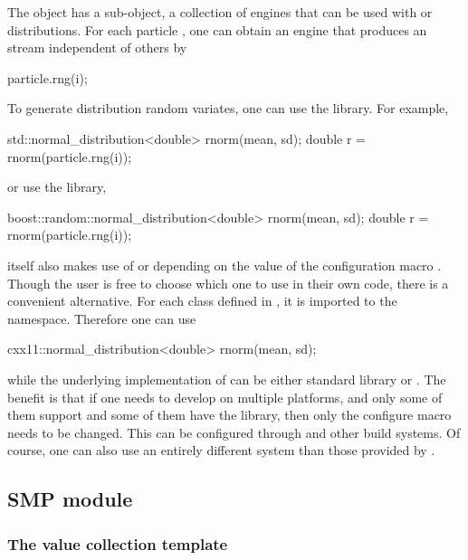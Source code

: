 The  object has a sub-object, a collection of \rng
engines that can be used with \cppoo{}  or \boost
distributions. For each particle , one can obtain an engine that
produces an \rng stream independent of others by
\begin{cppcode}
particle.rng(i);
\end{cppcode}
To generate distribution random variates, one can use the
\cppoo{}  library. For example,
\begin{cppcode}
std::normal_distribution<double> rnorm(mean, sd);
double r = rnorm(particle.rng(i));
\end{cppcode}
or use the \boost library,
\begin{cppcode}
boost::random::normal_distribution<double> rnorm(mean, sd);
double r = rnorm(particle.rng(i));
\end{cppcode}
\vsmc itself also makes use of \cppoo{}  or \boost
depending on the value of the configuration macro
. Though the user is free to choose which
one to use in their own code, there is a convenient alternative. For each
class defined in \cppoo{} , it is imported to the
 namespace. Therefore one can use
\begin{cppcode}
cxx11::normal_distribution<double> rnorm(mean, sd);
\end{cppcode}
while the underlying implementation of  can be
either \cppoo standard library or \boost. The benefit is that if one needs to
develop on multiple platforms, and only some of them support \cppoo and some
of them have the \boost library, then only the configure macro
 needs to be changed. This can be
configured through \cmake and other build systems. Of course, one can also use
an entirely different \rng system than those provided by \vsmc.

\subsection{SMP module}
\label{sub:SMP module}

\subsubsection{The value collection template}
\label{ssub:The value collection template}

